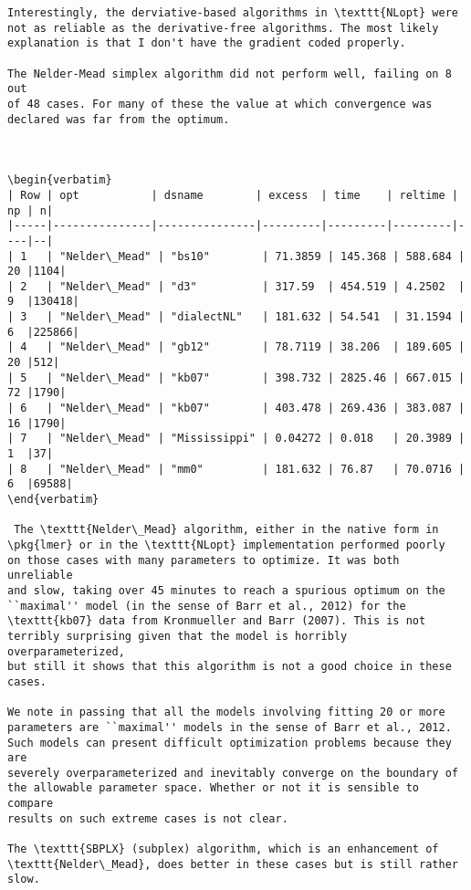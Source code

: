 \documentclass[article]{jss}
\begin{document}
\begin{Verbatim}
Interestingly, the derviative-based algorithms in \texttt{NLopt} were
not as reliable as the derivative-free algorithms. The most likely
explanation is that I don't have the gradient coded properly.

The Nelder-Mead simplex algorithm did not perform well, failing on 8 out
of 48 cases. For many of these the value at which convergence was
declared was far from the optimum.



\begin{verbatim}
| Row | opt           | dsname        | excess  | time    | reltime | np | n|
|-----|---------------|---------------|---------|---------|---------|----|--|
| 1   | "Nelder\_Mead" | "bs10"        | 71.3859 | 145.368 | 588.684 | 20 |1104|
| 2   | "Nelder\_Mead" | "d3"          | 317.59  | 454.519 | 4.2502  | 9  |130418|
| 3   | "Nelder\_Mead" | "dialectNL"   | 181.632 | 54.541  | 31.1594 | 6  |225866|
| 4   | "Nelder\_Mead" | "gb12"        | 78.7119 | 38.206  | 189.605 | 20 |512|
| 5   | "Nelder\_Mead" | "kb07"        | 398.732 | 2825.46 | 667.015 | 72 |1790|
| 6   | "Nelder\_Mead" | "kb07"        | 403.478 | 269.436 | 383.087 | 16 |1790|
| 7   | "Nelder\_Mead" | "Mississippi" | 0.04272 | 0.018   | 20.3989 | 1  |37|
| 8   | "Nelder\_Mead" | "mm0"         | 181.632 | 76.87   | 70.0716 | 6  |69588|  
\end{verbatim}

 The \texttt{Nelder\_Mead} algorithm, either in the native form in
\pkg{lmer} or in the \texttt{NLopt} implementation performed poorly
on those cases with many parameters to optimize. It was both unreliable
and slow, taking over 45 minutes to reach a spurious optimum on the
``maximal'' model (in the sense of Barr et al., 2012) for the
\texttt{kb07} data from Kronmueller and Barr (2007). This is not
terribly surprising given that the model is horribly overparameterized,
but still it shows that this algorithm is not a good choice in these
cases.

We note in passing that all the models involving fitting 20 or more
parameters are ``maximal'' models in the sense of Barr et al., 2012.
Such models can present difficult optimization problems because they are
severely overparameterized and inevitably converge on the boundary of
the allowable parameter space. Whether or not it is sensible to compare
results on such extreme cases is not clear.

The \texttt{SBPLX} (subplex) algorithm, which is an enhancement of
\texttt{Nelder\_Mead}, does better in these cases but is still rather
slow.



\end{Verbatim}
\end{document}
